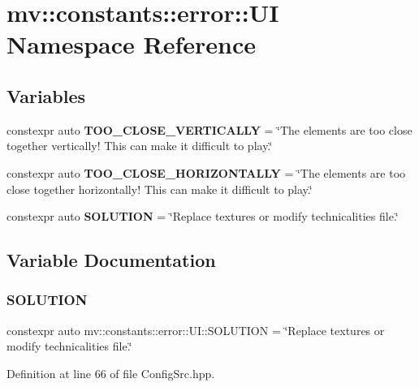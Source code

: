 \section{mv\+:\+:constants\+:\+:error\+:\+:UI Namespace Reference}
\label{namespacemv_1_1constants_1_1error_1_1_u_i}
\subsection*{Variables}
\begin{DoxyCompactItemize}
\item 
constexpr auto \textbf{ T\+O\+O\+\_\+\+C\+L\+O\+S\+E\+\_\+\+V\+E\+R\+T\+I\+C\+A\+L\+LY} = \char`\"{}The elements are too close together vertically! This can make it difficult to play.\char`\"{}
\item 
constexpr auto \textbf{ T\+O\+O\+\_\+\+C\+L\+O\+S\+E\+\_\+\+H\+O\+R\+I\+Z\+O\+N\+T\+A\+L\+LY} = \char`\"{}The elements are too close together horizontally! This can make it difficult to play.\char`\"{}
\item 
constexpr auto \textbf{ S\+O\+L\+U\+T\+I\+ON} = \char`\"{}Replace textures or modify \textquotesingle{}technicalities\textquotesingle{} file.\char`\"{}
\end{DoxyCompactItemize}


\subsection{Variable Documentation}
\mbox{\label{namespacemv_1_1constants_1_1error_1_1_u_i_a2d02b2d84b54a94a87181f14022e4cdc}} 
\subsubsection{S\+O\+L\+U\+T\+I\+ON}
{\footnotesize\ttfamily constexpr auto mv\+::constants\+::error\+::\+U\+I\+::\+S\+O\+L\+U\+T\+I\+ON = \char`\"{}Replace textures or modify \textquotesingle{}technicalities\textquotesingle{} file.\char`\"{}}



Definition at line 66 of file Config\+Src.\+hpp.

\mbox{\label{namespacemv_1_1constants_1_1error_1_1_u_i_ae00634e5d18d83e2af70b2cf36f788a6}} 
